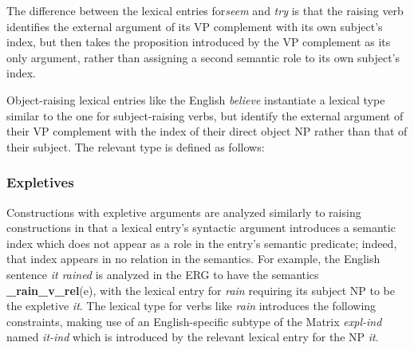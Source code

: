 \documentclass[12pt]{article}
\newcommand{\avmplus}[1]{{\setlength{\arraycolsep}{0.8mm}	
                       \renewcommand{\arraystretch}{1.1} %
                       \left[ 			
                       \begin{array}{l}
                       \\[-2mm] #1 \\[-2mm] \\
                       \end{array} 		
                       \right]
                    }}
\newcommand{\att}[1]{{\mbox{\scriptsize {\bf #1}}}}
\newcommand{\attval}[2]{{\mbox{\scriptsize #1}\ {{#2}}}}
\newcommand{\attvallist}[2]{{\mbox{\scriptsize #1}\ {<{#2}>}}}
\newcommand{\ind}[1]{{\setlength{\fboxsep}{0.25mm} \: \fbox{{\small #1}} \:}}
\begin{document}
The difference between the lexical entries for{\it seem} and {\it try} is
that the raising verb identifies the external argument of its VP complement
with its own subject's index, but then takes the proposition introduced by
the VP complement as its only argument, rather than assigning a second
semantic role to its own subject's index.

Object-raising lexical entries like the English {\it believe} instantiate
a lexical type similar to the one for subject-raising verbs, but identify 
the external argument of their VP complement with the index of their direct
object NP rather than that of their subject.  The relevant type is defined
as follows:

\subsubsection{Expletives}

Constructions with expletive arguments are analyzed similarly to raising
constructions in that a lexical entry's syntactic argument introduces a
semantic index which does not appear as a role in the entry's semantic
predicate; indeed, that index appears in no relation in the semantics.
For example, the English sentence {\it it rained} is analyzed in the ERG
to have the semantics {\bf \_rain\_v\_rel}(e), with the lexical entry for
{\it rain} requiring its subject NP to be the expletive {\it it}.  The
lexical type for verbs like {\it rain} introduces the following constraints,
making use of an English-specific subtype of the Matrix {\it expl-ind} named
{\it it-ind} which is introduced by the relevant lexical entry for the NP
{\it it}.
\end{document}
